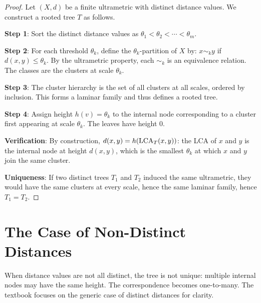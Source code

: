 \begin{proof}
Let $(X, d)$ be a finite ultrametric with distinct distance values. We construct a rooted tree $T$ as follows.

\textbf{Step 1}: Sort the distinct distance values as $\theta_1 < \theta_2 < \cdots < \theta_m$.

\textbf{Step 2}: For each threshold $\theta_k$, define the $\theta_k$-partition of $X$ by: $x \sim_k y$ if $d(x,y) \leq \theta_k$. By the ultrametric property, each $\sim_k$ is an equivalence relation. The classes are the clusters at scale $\theta_k$.

\textbf{Step 3}: The cluster hierarchy is the set of all clusters at all scales, ordered by inclusion. This forms a laminar family and thus defines a rooted tree.

\textbf{Step 4}: Assign height $h(v) = \theta_k$ to the internal node corresponding to a cluster first appearing at scale $\theta_k$. The leaves have height 0.

\textbf{Verification}: By construction, $d(x,y) = h(\operatorname{LCA}_T(x,y))$: the LCA of $x$ and $y$ is the internal node at height $d(x,y)$, which is the smallest $\theta_k$ at which $x$ and $y$ join the same cluster.

\textbf{Uniqueness}: If two distinct trees $T_1$ and $T_2$ induced the same ultrametric, they would have the same clusters at every scale, hence the same laminar family, hence $T_1 = T_2$.
\end{proof}

\section{The Case of Non-Distinct Distances}

When distance values are not all distinct, the tree is not unique: multiple internal nodes may have the same height. The correspondence becomes one-to-many. The textbook focuses on the generic case of distinct distances for clarity.
